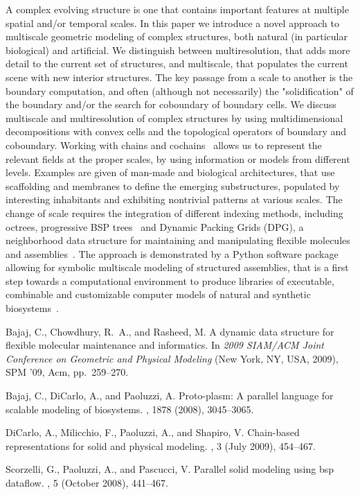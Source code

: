 A complex evolving structure is one that contains important features at multiple spatial and/or temporal scales. In this paper we introduce a novel approach to multiscale geometric modeling of complex structures, both natural (in particular biological) and artificial. We distinguish between multiresolution, that adds more detail to the current set of structures, and multiscale, that populates the current scene with new interior structures. The key passage from a scale to another is the boundary computation, and often (although not necessarily) the "solidification" of the boundary and/or the search for coboundary of boundary cells.  We discuss multiscale and multiresolution of complex structures by using multidimensional decompositions with convex cells and the topological operators of boundary and coboundary. Working with chains and cochains~\cite{DicarloMPS09} allows us to represent the relevant fields at the proper scales, by using information or models from different levels. Examples are given of man-made and biological architectures, that use scaffolding and membranes to define the emerging substructures, populated by interesting inhabitants and exhibiting nontrivial patterns at various scales. The change of scale requires the integration of different indexing methods, including octrees, progressive BSP trees~\cite{ScorzelliPP-PSM2008} and Dynamic Packing Grids (DPG), a neighborhood data structure for maintaining and manipulating flexible molecules and assemblies~\cite{Bajaj:2009:DDS:1629255.1629287}. The approach is demonstrated by a Python software package allowing for symbolic multiscale modeling of structured assemblies, that is a first step towards a computational environment to produce libraries of executable, combinable and customizable computer models of natural and synthetic biosystems~\cite{BajajDP-PPP2008}.



\begin{thebibliography}{10}

{\sc Bajaj, C., Chowdhury, R.~A., and Rasheed, M.}
\newblock A dynamic data structure for flexible molecular maintenance and informatics.
\newblock In {\em 2009 SIAM/ACM Joint Conference on Geometric and Physical Modeling\/} (New York, NY, {USA}, 2009), SPM '09, Acm, pp.~259--270.

{\sc Bajaj, C., DiCarlo, A., and Paoluzzi, A.}
\newblock Proto-plasm: A parallel language for scalable modeling of biosystems.
, 1878 (2008), 3045--3065.

{\sc DiCarlo, A., Milicchio, F., Paoluzzi, A., and Shapiro, V.}
\newblock Chain-based representations for solid and physical modeling.
, 3 (July 2009), 454--467.

{\sc Scorzelli, G., Paoluzzi, A., and Pascucci, V.}
\newblock Parallel solid modeling using bsp dataflow.
, 5 (October 2008), 441--467.

\end{thebibliography}